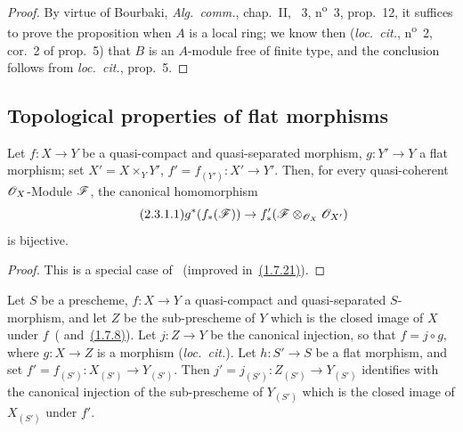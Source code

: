 \begin{proof}
By virtue of Bourbaki, \emph{Alg.~comm.}, chap.~II, \textsection~3, n\textsuperscript{o}~3, prop.~12, it suffices to prove the proposition when $A$ is a local ring; we know then (\emph{loc.~cit.}, n\textsuperscript{o}~2, cor.~2 of prop.~5) that $B$ is an $A$-module free of finite type, and the conclusion follows from \emph{loc.~cit.}, prop.~5.
\end{proof}

\subsection{Topological properties of flat morphisms}
\label{subsection:IV.2.3}

\begin{lemma}[2.3.1]
\label{IV.2.3.1}
Let $f:X\to Y$ be a quasi-compact and quasi-separated morphism, $g:Y'\to Y$ a flat morphism; set $X'=X\times_Y Y'$, $f'=f_{(Y')}:X'\to Y'$.
Then, for every quasi-coherent $\mathscr{O}_X$-Module $\mathscr{F}$, the canonical homomorphism
\begin{equation}
\tag{2.3.1.1}
\label{IV.2.3.1.1}
  g^*(f_*(\mathscr{F})) \to f'_*(\mathscr{F}\otimes_{\mathscr{O}_X}\mathscr{O}_{X'})
\end{equation}
is bijective.
\end{lemma}

\begin{proof}
This is a special case of~ (improved in~{\hyperref[IV.1.7.21]{(1.7.21)}}).
\end{proof}

\begin{proposition}[2.3.2]
\label{IV.2.3.2}
Let $S$ be a prescheme, $f:X\to Y$ a quasi-compact and quasi-separated $S$-morphism, and let $Z$ be the sub-prescheme of $Y$ which is the closed image of $X$ under $f$~\textnormal{(} and~{\hyperref[IV.1.7.8]{(1.7.8)}}\textnormal{)}.
Let $j:Z\to Y$ be the canonical injection, so that $f=j\circ g$, where $g:X\to Z$ is a morphism \textnormal{(}\emph{loc.~cit.}\textnormal{)}.
Let $h:S'\to S$ be a flat morphism, and set $f'=f_{(S')}:X_{(S')}\to Y_{(S')}$.
Then $j'=j_{(S')}:Z_{(S')}\to Y_{(S')}$ identifies with the canonical injection of the sub-prescheme of $Y_{(S')}$ which is the closed image of $X_{(S')}$ under $f'$.
\end{proposition}

